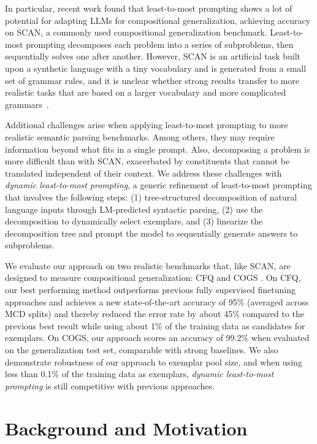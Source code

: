 \documentclass{article} \usepackage{iclr2022_conference,times}
\begin{document}
In particular, recent work \citep{zhou2022leasttomost} found that least-to-most prompting shows a lot of potential for adapting LLMs for compositional generalization, achieving  accuracy on SCAN, a commonly used compositional generalization benchmark. Least-to-most prompting decomposes each problem into a series of subproblems, then sequentially solves one after another. However, SCAN is an artificial task built upon a synthetic language with a tiny vocabulary and is generated from a small set of grammar rules, and it is unclear whether strong results transfer to more realistic tasks that are based on a larger vocabulary and more complicated grammars~\citep{Furrer2020CompositionalGI}.

Additional challenges arise when applying least-to-most prompting to more realistic semantic parsing benchmarks. Among others, they may require information beyond what fits in a single prompt. Also, decomposing a problem is more difficult than with SCAN, exacerbated by constituents that cannot be translated independent of their context.
We address these challenges with \textit{dynamic least-to-most prompting}, a generic refinement of least-to-most prompting that involves the following steps: (1) tree-structured decomposition of natural language inputs through LM-predicted syntactic parsing, (2) use the decomposition to dynamically select exemplars, and (3) linearize the decomposition tree and prompt the model to sequentially generate answers to subproblems. 


We evaluate our approach on two realistic benchmarks that, like SCAN, are designed to measure compositional generalization: CFQ \citep{Keysers2020MeasuringCG} and COGS \citep{kim-linzen-2020-cogs}. On CFQ, our best performing method outperforms previous fully supervised finetuning approaches and achieves a new state-of-the-art accuracy of 95\% (averaged across MCD splits) and thereby reduced the error rate by about 45\% compared to the previous best result while using about 1\% of the training data as candidates for exemplars. On COGS, our approach scores an accuracy of 99.2\% when evaluated on the generalization test set, comparable with strong baselines. We also demonstrate robustness of our approach to exemplar pool size, and when using less than 0.1\% of the training data as exemplars, \textit{dynamic least-to-most prompting} is still competitive with previous approaches.

\section{Background and Motivation \label{sec:background}}
\end{document}
